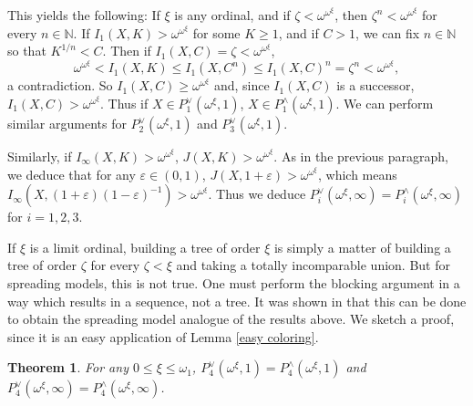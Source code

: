 \documentclass[12pt]{amsart}
\newtheorem{theorem}{Theorem}[section]
\theoremstyle{definition}
\newcommand{\nn}{\mathbb{N}}
\begin{document}
This yields the following: If $\xi$ is any ordinal, and if $\zeta<\omega^{\omega^\xi}$, then $\zeta^n<\omega^{\omega^\xi}$ for every $n\in \nn$.  If $I_1(X, K)>\omega^{\omega^\xi}$ for some $K\geqslant 1$, and if $C>1$, we can fix $n\in \nn$ so that $K^{1/n}< C$.  Then if $I_1(X, C)=\zeta<\omega^{\omega^\xi}$, $$\omega^{\omega^\xi}< I_1(X,K) \leqslant I_1(X, C^n) \leqslant I_1(X, C)^n = \zeta^n< \omega^{\omega^\xi},$$ a contradiction.  So $I_1(X, C)\geqslant \omega^{\omega^\xi}$ and, since $I_1(X,C)$ is a successor, $I_1(X,C)>\omega^{\omega^\xi}$.  Thus if $X\in P^\vee_1(\omega^\xi, 1)$, $X\in P^\wedge_1(\omega^\xi, 1)$.  We can perform similar arguments for $P^\vee_2(\omega^\xi, 1)$ and $P^\vee_3(\omega^\xi, 1)$.  

Similarly, if $I_\infty(X, K)>\omega^{\omega^\xi}$, $J(X, K)>\omega^{\omega^\xi}$.  As in the previous paragraph, we deduce that for any $\varepsilon\in (0,1)$, $J(X, 1+\varepsilon)>\omega^{\omega^\xi}$, which means $I_\infty(X, (1+\varepsilon)(1-\varepsilon)^{-1})>\omega^{\omega^\xi}$.  Thus we deduce $P^\vee_i(\omega^\xi, \infty)=P^\wedge_i(\omega^\xi, \infty)$ for $i=1,2,3$.  

If $\xi$ is a limit ordinal, building a tree of order $\xi$ is simply a matter of building a tree of order $\zeta$ for every $\zeta<\xi$ and taking a totally incomparable union.  But for spreading models, this is not true.  One must perform the blocking argument in a way which results in a sequence, not a tree.  It was shown in \cite{BCM} that this can be done to obtain the spreading model analogue of the results above. We sketch a proof, since it is an easy application of Lemma \ref{easy coloring}. 


\begin{theorem} For any $0\leqslant \xi\leqslant \omega_1$, $P^\vee_4(\omega^\xi, 1)=P^\wedge_4(\omega^\xi, 1)$ and $P^\vee_4(\omega^\xi, \infty)=P^\wedge_4(\omega^\xi, \infty)$.  

\label{BCM theorem 1}

\end{theorem}
\end{document}
